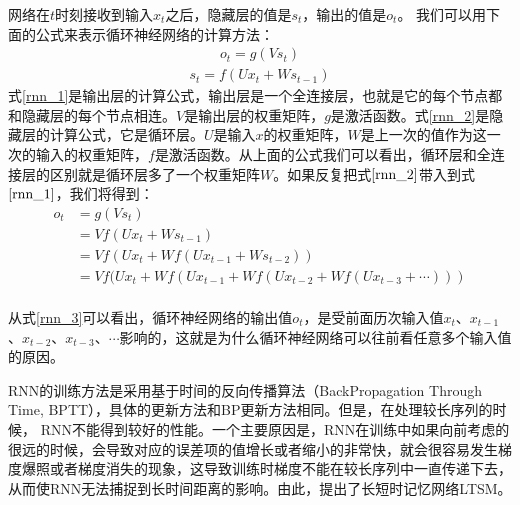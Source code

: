 网络在$t$时刻接收到输入$x_{t}$之后，隐藏层的值是$s_{t}$，输出的值是$o_{t}$。
我们可以用下面的公式来表示循环神经网络的计算方法：
\begin{equation}
\label{rnn_1}
\begin{aligned}
o_{t}=g(V s_{t})
\end{aligned}
\end{equation}
\begin{equation}
\label{rnn_2}
\begin{aligned}
s_{t}=f(U x_{t}+W s_{t-1})
\end{aligned}
\end{equation}
式\eqref{rnn_1}是输出层的计算公式，输出层是一个全连接层，也就是它的每个节点都和隐藏层的每个节点相连。$V$是输出层的权重矩阵，$g$是激活函数。式\eqref{rnn_2}是隐藏层的计算公式，它是循环层。$U$是输入$x$的权重矩阵，$W$是上一次的值作为这一次的输入的权重矩阵，$f$是激活函数。从上面的公式我们可以看出，循环层和全连接层的区别就是循环层多了一个权重矩阵$W$。如果反复把式$\eqref{rnn_2}$带入到式$\eqref{rnn_1}$，我们将得到：
\begin{equation}
\label{rnn_3}
\begin{aligned}
o_{t}&=g(V s_{t})\\
&=V f(U x_{t}+W s_{t-1})\\
&=V f(U x_{t}+W f(U x_{t-1}+W s_{t-2}))\\
&=V f(U x_{t}+W f(U x_{t-1}+W f(U x_{t-2}+W f(U x_{t-3}+\cdots)))\\
\end{aligned}
\end{equation}

从式\eqref{rnn_3}可以看出，循环神经网络的输出值$o_{t}$，是受前面历次输入值$x_{t}$、$x_{t-1}$、$x_{t-2}$、$x_{t-3}$、$\cdots$影响的，这就是为什么循环神经网络可以往前看任意多个输入值的原因。

RNN的训练方法是采用基于时间的反向传播算法（BackPropagation Through Time, BPTT），具体的更新方法和BP更新方法相同。但是，在处理较长序列的时候， RNN不能得到较好的性能。一个主要原因是，RNN在训练中如果向前考虑的很远的时候，会导致对应的误差项的值增长或者缩小的非常快，就会很容易发生梯度爆照或者梯度消失的现象，这导致训练时梯度不能在较长序列中一直传递下去，从而使RNN无法捕捉到长时间距离的影响。由此，提出了长短时记忆网络LTSM。


